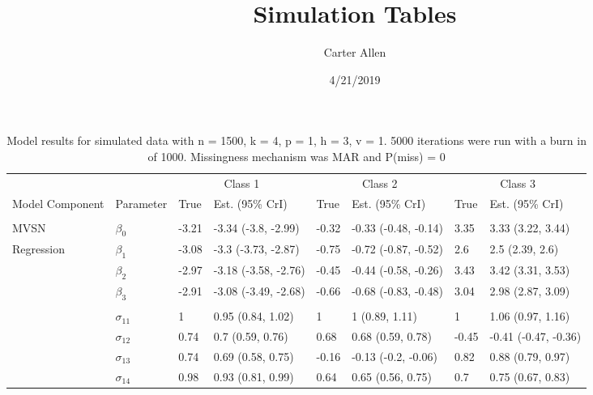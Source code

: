 \documentclass[]{article}
\title{Simulation Tables}
\author{Carter Allen}
\date{4/21/2019}
\begin{document}
\maketitle

\begin{table}

\caption{\label{tab:unnamed-chunk-4}Model results for simulated data with n = 1500, k = 4, p = 1, h = 3, v = 1. 5000 iterations were run with a burn in of 1000. Missingness mechanism was MAR and P(miss) = 0}
\centering
\fontsize{8}{10}\selectfont
\begin{tabular}[t]{llllllll}
\toprule
\multicolumn{2}{c}{ } & \multicolumn{2}{c}{Class 1} & \multicolumn{2}{c}{Class 2} & \multicolumn{2}{c}{Class 3} \\
\cmidrule(l{2pt}r{2pt}){3-4} \cmidrule(l{2pt}r{2pt}){5-6} \cmidrule(l{2pt}r{2pt}){7-8}
Model Component & Parameter & True & Est. (95\% CrI) & True & Est. (95\% CrI) & True & Est. (95\% CrI)\\
\midrule
\addlinespace[0.3em]
\multicolumn{8}{l}{\textbf{ }}\\
\hspace{1em}MVSN & $\beta_{0}$ & -3.21 & -3.34 (-3.8, -2.99) & -0.32 & -0.33 (-0.48, -0.14) & 3.35 & 3.33 (3.22, 3.44)\\
\hspace{1em}Regression & $\beta_{1}$ & -3.08 & -3.3 (-3.73, -2.87) & -0.75 & -0.72 (-0.87, -0.52) & 2.6 & 2.5 (2.39, 2.6)\\
\hspace{1em} & $\beta_{2}$ & -2.97 & -3.18 (-3.58, -2.76) & -0.45 & -0.44 (-0.58, -0.26) & 3.43 & 3.42 (3.31, 3.53)\\
\hspace{1em} & $\beta_{3}$ & -2.91 & -3.08 (-3.49, -2.68) & -0.66 & -0.68 (-0.83, -0.48) & 3.04 & 2.98 (2.87, 3.09)\\
\addlinespace[0.3em]
\multicolumn{8}{l}{\textbf{ }}\\
\hspace{1em} & $\sigma_{11}$ & 1 & 0.95 (0.84, 1.02) & 1 & 1 (0.89, 1.11) & 1 & 1.06 (0.97, 1.16)\\
\hspace{1em} & $\sigma_{12}$ & 0.74 & 0.7 (0.59, 0.76) & 0.68 & 0.68 (0.59, 0.78) & -0.45 & -0.41 (-0.47, -0.36)\\
\hspace{1em} & $\sigma_{13}$ & 0.74 & 0.69 (0.58, 0.75) & -0.16 & -0.13 (-0.2, -0.06) & 0.82 & 0.88 (0.79, 0.97)\\
\hspace{1em} & $\sigma_{14}$ & 0.98 & 0.93 (0.81, 0.99) & 0.64 & 0.65 (0.56, 0.75) & 0.7 & 0.75 (0.67, 0.83)\\

\end{tabular}
\end{table}
\end{document}
